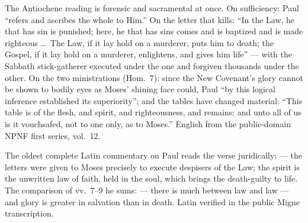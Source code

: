 \begin{witnessnote}
The Antiochene reading is forensic and sacramental at once. On sufficiency:
Paul ``refers and ascribes the whole to Him.'' On the letter that kills:
``In the Law, he that has sin is punished; here, he that has sins comes and
is baptized and is made righteous \dots\ The Law, if it lay hold on a
murderer, puts him to death; the Gospel, if it lay hold on a murderer,
enlightens, and gives him life'' --- with the Sabbath stick-gatherer executed
under the one and forgiven thousands under the other. On the two
ministrations (Hom.~7): since the New Covenant's glory cannot be shown to
bodily eyes as Moses' shining face could, Paul ``by this logical inference
established its superiority''; and the tables have changed material: ``This
table is of the flesh, and spirit, and righteousness, and remains; and unto
all of us is it vouchsafed, not to one only, as to Moses.'' English from the
public-domain NPNF first series, vol.~12.
\end{witnessnote}

\begin{witnessnote}
The oldest complete Latin commentary on Paul reads the verse juridically:
 --- the letters were given to
Moses precisely to execute despisers of the Law; the spirit is the unwritten
law of faith, held in the soul, which brings the death-guilty to life. The
comparison of vv.~7--9 he sums:  --- there is much between law and law --- and glory is greater in
salvation than in death. Latin verified in the public Migne transcription.
\end{witnessnote}

